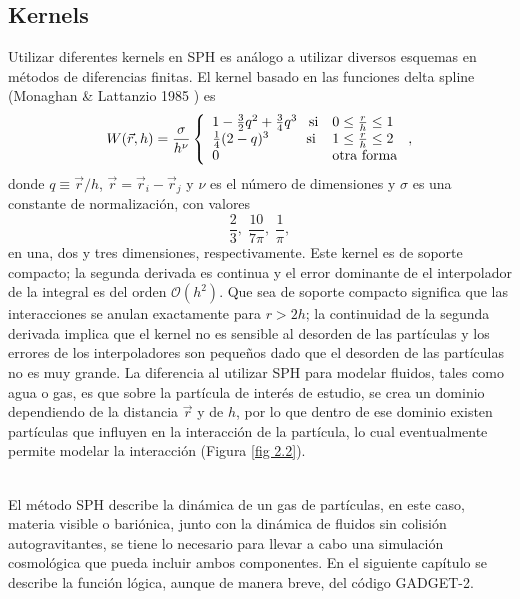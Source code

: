\documentclass[a4paper,openright,10pt, oneside, final]{book}
\begin{document}
\subsection{Kernels}
Utilizar diferentes kernels en SPH es análogo a utilizar diversos esquemas en métodos de diferencias finitas. El kernel basado en las funciones delta spline (Monaghan \& Lattanzio  1985 \cite{b8.1}) es
\begin{equation}
W(\vec{r},h) = \frac{\sigma}{h^{\nu}} \left\lbrace
\begin{array}{ll}
1- \frac{3}{2}q^{2} +\frac{3}{4}q^{3} \;\;\;\textup{si} & 0 \leq \frac{r}{h} \leq 1\\

\frac{1}{4}(2-q)^{3} \;\;\;\;\;\;\,\,\,\,\,\, \textup{si} & 1 \leq \frac{r}{h} \leq 2\\
0 & \textup{otra forma}
\end{array}
\right.,\label{eqn 2.43}
\end{equation}
donde $ q\equiv \vec{r}/h$, $\vec{r}=\vec{r}_{i} - \vec{r}_{j}$ y $\nu$ es el número de dimensiones y $\sigma$ es una constante de normalización, con valores
\begin{equation*}
\frac{2}{3}, \; \frac{10}{7\pi}, \; \frac{1}{\pi},
\end{equation*}
en una, dos y tres dimensiones, respectivamente. Este kernel es de soporte compacto; la segunda derivada es continua y el error dominante de el interpolador de la integral es del orden $\mathcal{O}(h^{2})$. Que sea de soporte compacto significa que las interacciones se anulan exactamente para $r>2h$; la continuidad de la segunda derivada implica que el kernel no es sensible al desorden de las partículas y los errores de los interpoladores son pequeños dado que el desorden de las partículas no es muy grande. La diferencia al utilizar SPH para modelar fluidos, tales como agua o gas, es que sobre la partícula de interés de estudio, se crea un dominio dependiendo de la distancia $\vec{r}$ y de $h$, por lo que dentro de ese dominio existen partículas que influyen en la interacción de la partícula, lo cual eventualmente permite modelar la interacción (Figura \ref{fig 2.2}).\\\


El método SPH describe la dinámica de un gas de partículas, en este caso, materia visible o bariónica, junto con la dinámica de fluidos sin colisión autogravitantes, se tiene lo necesario para llevar a cabo una simulación cosmológica que pueda incluir ambos componentes. En el siguiente capítulo se describe la función lógica, aunque de manera breve, del código GADGET-2.
\end{document}

